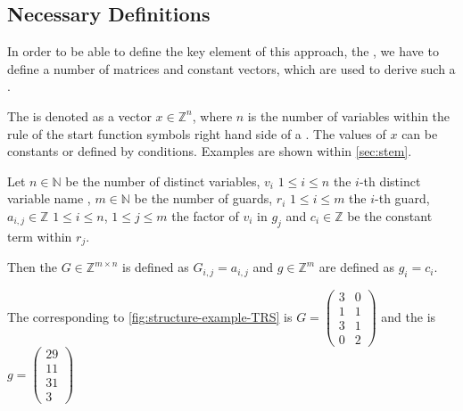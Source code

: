 \subsection{Necessary Definitions}
In order to be able to define the key element of this approach, the \gna, we have to define a number of matrices and constant vectors, which are used to derive such a \gna. 

\begin{definition}[\stem]
	The \stem is denoted as a vector $x \in \mathbb{Z}^n$, where $n$ is the number of variables within the rule of the start function symbols right hand side of a \its. The values of $x$ can be constants or defined by conditions. Examples are shown within \autoref{sec:stem}.
\end{definition}

\begin{definition}
	\label{def:guard}
	Let $n \in \mathbb{N}$ be the number of distinct variables, $v_i$ $1 \le i \le n$ the $i$-th distinct variable name , $m \in \mathbb{N}$ be the number of guards, $r_i$ $1 \le i \le m$ the $i$-th guard, $a_{i,j} \in \mathbb{Z}$ $1\le i \le n$, $1 \le j \le m$ the factor of $v_i$ in $g_j$ and $c_i \in \mathbb{Z}$ be the constant term within $r_j$. \newline
		
	Then the \guardmatrix $G \in \mathbb{Z}^{m\times n}$ is defined as $G_{i,j}=a_{i,j} $ and \guardconstants $g \in \mathbb{Z}^m$ are defined as $g_i = c_i$.
\end{definition}
\begin{example}
	The corresponding \guardmatrix to \autoref{fig:structure-example-TRS} is $G = \begin{pmatrix} 3 & 0 \\ 1 & 1 \\ 3 & 1 \\ 0 & 2 \end{pmatrix}$ and the \guardconstants is $g= \begin{pmatrix} 29 \\ 11 \\ 31 \\ 3 \end{pmatrix}$
\end{example}

